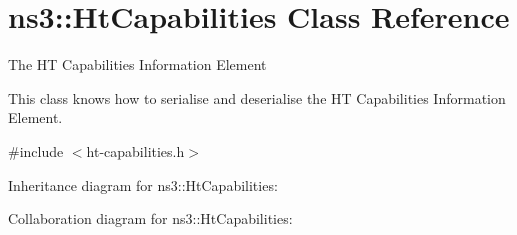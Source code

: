 \hypertarget{classns3_1_1HtCapabilities}{}\section{ns3\+:\+:Ht\+Capabilities Class Reference}
\label{classns3_1_1HtCapabilities}


The HT Capabilities Information Element

This class knows how to serialise and deserialise the HT Capabilities Information Element.  




{\ttfamily \#include $<$ht-\/capabilities.\+h$>$}



Inheritance diagram for ns3\+:\+:Ht\+Capabilities\+:


Collaboration diagram for ns3\+:\+:Ht\+Capabilities\+:
